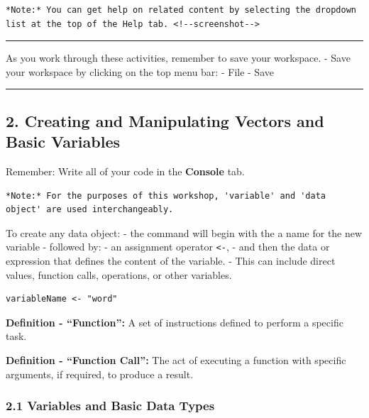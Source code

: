 \documentclass[
]{article}
\begin{document}
\leavevmode{}%

\begin{verbatim}
*Note:* You can get help on related content by selecting the dropdown list at the top of the Help tab. <!--screenshot-->
\end{verbatim}

\begin{center}\rule{0.5\linewidth}{0.5pt}\end{center}

As you work through these activities, remember to save your workspace. -
Save your workspace by clicking on the top menu bar: - File - Save

\begin{center}\rule{0.5\linewidth}{0.5pt}\end{center}

\hypertarget{creating-and-manipulating-vectors-and-basic-variables}{%
\subsection{2. Creating and Manipulating Vectors and Basic
Variables}\label{creating-and-manipulating-vectors-and-basic-variables}}

Remember: Write all of your code in the \textbf{Console} tab.

\begin{verbatim}
*Note:* For the purposes of this workshop, 'variable' and 'data object' are used interchangeably.
\end{verbatim}

To create any data object: - the command will begin with the a name for
the new variable - followed by: - an assignment operator
\texttt{\textless{}-}, - and then the data or expression that defines
the content of the variable. - This can include direct values, function
calls, operations, or other variables.

\begin{verbatim}
variableName <- "word"
\end{verbatim}

\textbf{Definition - ``Function'':} A set of instructions defined to
perform a specific task.

\textbf{Definition - ``Function Call'':} The act of executing a function
with specific arguments, if required, to produce a result.

\hypertarget{variables-and-basic-data-types}{%
\subsubsection{2.1 Variables and Basic Data
Types}\label{variables-and-basic-data-types}}
\end{document}
